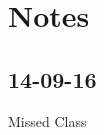 \documentclass{article}
\newcommand{\0}{0}
\begin{document}
\section{Notes}





\subsection{14-09-16}
Missed Class


\end{document}
